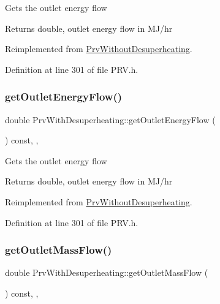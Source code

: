 Gets the outlet energy flow \begin{DoxyReturn}{Returns}
double, outlet energy flow in M\+J/hr 
\end{DoxyReturn}


Reimplemented from \hyperlink{class_prv_without_desuperheating_a6529a68ffa444ae87c890b2bcbc2cc84}{Prv\+Without\+Desuperheating}.



Definition at line 301 of file P\+R\+V.\+h.

\mbox{\label{class_prv_with_desuperheating_a2394fb62e4fc85252fc4eb15f08e9f1e}} 
\subsubsection{\texorpdfstring{get\+Outlet\+Energy\+Flow()}{getOutletEnergyFlow()}\hspace{0.1cm}{\footnotesize\ttfamily [3/3]}}
{\footnotesize\ttfamily double Prv\+With\+Desuperheating\+::get\+Outlet\+Energy\+Flow (\begin{DoxyParamCaption}{ }\end{DoxyParamCaption}) const\hspace{0.3cm}{\ttfamily [inline]}, {\ttfamily [override]}, {\ttfamily [virtual]}}

Gets the outlet energy flow \begin{DoxyReturn}{Returns}
double, outlet energy flow in M\+J/hr 
\end{DoxyReturn}


Reimplemented from \hyperlink{class_prv_without_desuperheating_a6529a68ffa444ae87c890b2bcbc2cc84}{Prv\+Without\+Desuperheating}.



Definition at line 301 of file P\+R\+V.\+h.

\mbox{\label{class_prv_with_desuperheating_a76c03ff2f54c85cd0c80543f23549635}} 
\subsubsection{\texorpdfstring{get\+Outlet\+Mass\+Flow()}{getOutletMassFlow()}\hspace{0.1cm}{\footnotesize\ttfamily [1/3]}}
{\footnotesize\ttfamily double Prv\+With\+Desuperheating\+::get\+Outlet\+Mass\+Flow (\begin{DoxyParamCaption}{ }\end{DoxyParamCaption}) const\hspace{0.3cm}{\ttfamily [inline]}, {\ttfamily [override]}, {\ttfamily [virtual]}}

